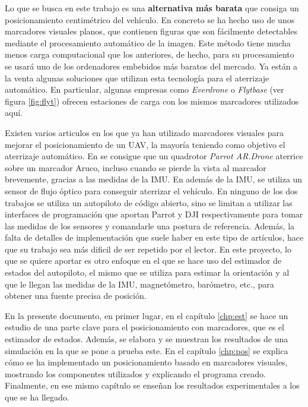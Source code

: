 Lo que se busca en este trabajo es una \textbf{alternativa más barata} que consiga un posicionamiento centimétrico del vehículo. En concreto se ha hecho uso de unos marcadores visuales planos, que contienen figuras que son fácilmente detectables mediante el procesamiento automático de la imagen. Este método tiene mucha menos carga computacional que los anteriores, de hecho, para su procesamiento se usará uno de los ordenadores embebidos más baratos del mercado.
Ya están a la venta algunas soluciones que utilizan esta tecnología para el aterrizaje automático. En particular, algunas  empresas como \textit{Everdrone} \cite{everdrone} o \textit{Flytbase} (ver figura \ref{fig:flyt}) ofrecen estaciones de carga con los mismos marcadores utilizados aquí. 

Existen varios articulos en los que ya han utilizado marcadores visuales para mejorar el posicionamiento de un UAV, la mayoría teniendo como objetivo el aterrizaje automático. En \cite{sani2017automatic} se consigue que un quadrotor \textit{Parrot AR.Drone} aterrice sobre un marcador Aruco, incluso cuando se pierde la vista al marcador brevemente, gracias a las medidas de la IMU. En \cite{yang2015precise} además de la IMU, se utiliza un sensor de flujo óptico para conseguir aterrizar el vehículo. En ninguno de los dos trabajos se utiliza un autopiloto de código abierto, sino se limitan a utilizar las interfaces de programación que aportan Parrot y DJI respectivamente para tomar las medidas de los sensores y comandarle una postura de referencia. 
Además, la falta de detalles de implementación que suele haber en este tipo de artículos, hace que su trabajo sea más dificil de ser repetido por el lector.
En este proyecto, lo que se quiere aportar es otro enfoque en el que se hace uso del estimador de estados del autopiloto, el mismo que se utiliza para estimar la orientación y al que le llegan las medidas de la IMU, magnetómetro, barómetro, etc., para obtener una fuente precisa de posición.  

En la presente documento, en primer lugar, en el capítulo \ref{chp:est} se hace un estudio de una parte clave para el posicionamiento con marcadores, que es el estimador de estados. Además, se elabora y se muestran los resultados de una simulación en la que se pone a prueba este. En el capítulo \ref{chp:pos} se explica cómo se ha implementado un posicionamiento basado en marcadores visuales, mostrando los componentes utilizados y explicando el programa creado. Finalmente, en ese mismo capítulo se enseñan los resultados experimentales a los que se ha llegado.  




\endinput
